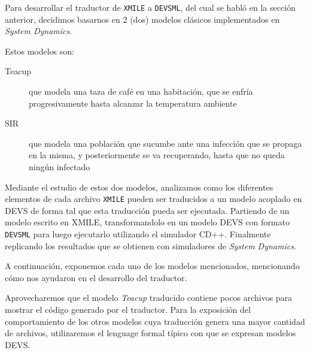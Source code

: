 Para desarrollar el traductor de \texttt{XMILE} a \texttt{DEVSML}, del cual se habló en la sección anterior, decidimos basarnos en 2 (dos) modelos clásicos implementados en \textit{System Dynamics}. 

Estos modelos son: 
\begin{description}
	\item[Teacup] que modela una taza de café en una habitación, que se enfría progresivamente hasta alcanzar la temperatura ambiente
	\item[SIR] 	que modela una población que sucumbe ante una infección que se propaga en la misma, y posteriormente se va recuperando, hasta que no queda ningún infectado
\end{description}

Mediante el estudio de estos dos modelos, analizamos como los diferentes elementos de cada archivo \texttt{XMILE} pueden ser traducidos a un modelo acoplado en DEVS  de forma tal que esta traducción pueda ser ejecutada. 
Partiendo de un modelo escrito en XMILE, transformandolo en un modelo DEVS con formato \texttt{DEVSML} para luego ejecutarlo utilizando el simulador CD++. Finalmente replicando los resultados que se obtienen con simuladores de \textit{System Dynamics}.


A continuación, exponemos cada uno de los modelos mencionados, mencionando cómo nos ayudaron en el desarrollo del traductor. 

Aprovecharemos que el modelo \textit{Teacup} traducido contiene pocos archivos para mostrar el código generado por el traductor. Para la exposición del comportamiento de los otros modelos cuya traducción genera una mayor cantidad de archivos, utilizaremos el lenguage formal típico con que se expresan modelos DEVS.
